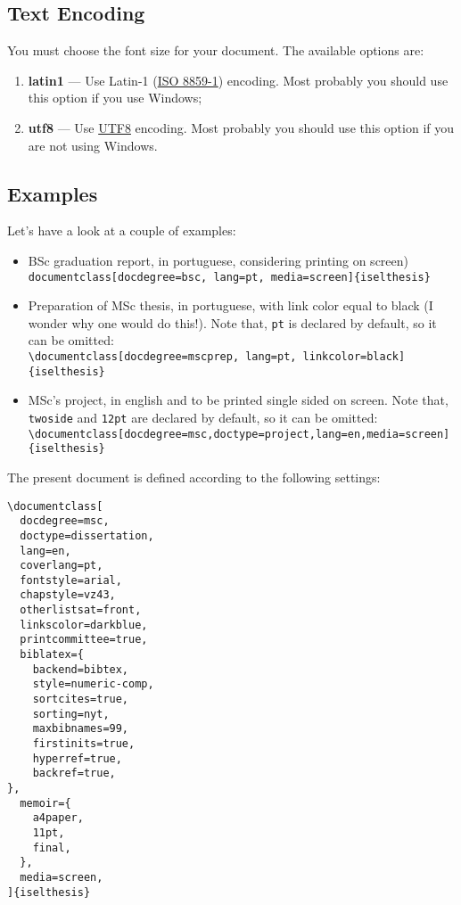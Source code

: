 \subsection{Text Encoding} %
\label{ssec:text_encoding}

You must choose the font size for your document. The available options are:
\begin{enumerate}
	\item \textbf{latin1} --- Use Latin-1 (\href{http://en.wikipedia.org/wiki/ISO/IEC_8859-1}{ISO 8859-1}) encoding.  Most probably you should use this option if you use Windows;
	\item \textbf{utf8} --- Use \href{http://en.wikipedia.org/wiki/UTF-8}{UTF8} encoding.    Most probably you should use this option if you are not using Windows.
\end{enumerate}

\subsection{Examples} %
\label{ssec:examples}

Let's have a look at a couple of examples:

\begin{itemize}
	\item BSc graduation report, in portuguese, considering printing on screen)\\
	\verb!documentclass[docdegree=bsc, lang=pt, media=screen]{iselthesis}!
	\item Preparation of MSc thesis, in portuguese, with link color equal to black (I wonder why one would do this!). Note that, \verb!pt! is declared by default, so it can be omitted: \\
	\verb!\documentclass[docdegree=mscprep, lang=pt, linkcolor=black]{iselthesis}!
	\item MSc's project, in english and to be printed single sided on screen. Note that, \verb!twoside! and \verb!12pt! are declared by default, so it can be omitted: \\
	\verb!\documentclass[docdegree=msc,doctype=project,lang=en,media=screen]{iselthesis}!
\end{itemize}


The present document is defined according to the following settings:
\begin{Verbatim}[breaklines=true, breakanywhere=true]
\documentclass[
  docdegree=msc,       
  doctype=dissertation, 
  lang=en,             
  coverlang=pt,        
  fontstyle=arial,   
  chapstyle=vz43,    
  otherlistsat=front,   
  linkscolor=darkblue,  
  printcommittee=true, 
  biblatex={            
    backend=bibtex,		  
    style=numeric-comp, 
    sortcites=true,     
    sorting=nyt,       
    maxbibnames=99,			
    firstinits=true,   
    hyperref=true,
    backref=true,      
},
  memoir={	          
    a4paper,          
    11pt,              
    final,            
  },
  media=screen,         
]{iselthesis}
\end{Verbatim}

